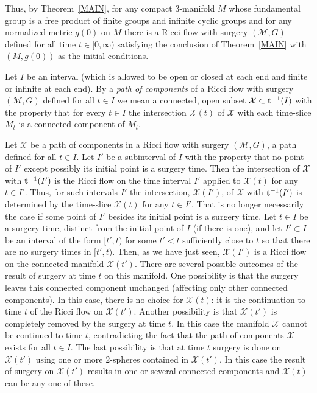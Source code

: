 Thus, by Theorem~\ref{MAIN},  for any compact $3$-manifold $M$ whose
fundamental group is a free product of finite groups and infinite cyclic groups
and for any normalized metric $g(0)$ on $M$ there is a Ricci flow with surgery
$({\mathcal M},G)$ defined for all time $t\in [0,\infty)$ satisfying the
conclusion of Theorem~\ref{MAIN} with $(M,g(0))$ as the initial conditions.

\begin{definition}
\label{def:path-of-components}
Let $I$ be an interval (which is allowed to be open or closed at
each end and finite or infinite at each end). By a {\em path of
components} of a Ricci flow with surgery $({\mathcal M},G)$ defined
for all $t\in I$ we mean a connected, open subset ${\mathcal
X}\subset {\bf t}^{-1}(I)$ with the property that for every $t\in I$
the intersection ${\mathcal X}(t)$ of ${\mathcal X}$ with each
time-slice $M_t$ is a connected component of $M_t$.
\end{definition}

Let ${\mathcal X}$ be a path of components in a Ricci flow with surgery
$({\mathcal M},G)$, a path defined for all $t\in I$. Let $I'$ be a subinterval
of $I$ with the property that no point of $I'$ except possibly its initial
point is a surgery time.  Then the intersection of ${\mathcal X}$ with ${\bf
t}^{-1}(I')$ is  the Ricci flow on the time interval $I'$ applied to ${\mathcal
X}(t)$ for any $t\in I'$.  Thus, for such intervals $I'$ the intersection,
${\mathcal X}(I')$, of ${\mathcal X}$ with ${\bf t}^{-1}(I')$ is determined by
the time-slice ${\mathcal X}(t)$ for any $t\in I'$. That is no longer
necessarily the case if some point of $I'$ besides its initial point is a
surgery time. Let $t\in I$ be a surgery time, distinct from the initial point
of $I$ (if there is one), and let $I'\subset I$ be an interval of the form
$[t',t)$ for some $t'<t$ sufficiently close to $t$ so that there are no surgery
times in $[t',t)$. Then, as we have just seen, ${\mathcal X}(I')$ is a Ricci
flow on the connected manifold ${\mathcal X}(t')$. There are several possible
outcomes of the result of surgery at time $t$ on this manifold. One possibility
is that the surgery leaves this connected component unchanged (affecting only
other connected components). In this case, there is no choice for ${\mathcal
X}(t)$: it is the continuation to time $t$ of the Ricci flow on ${\mathcal
X}(t')$. Another possibility is that ${\mathcal X}(t')$ is completely removed
by the surgery at time $t$. In this case the manifold ${\mathcal X}$ cannot be
continued to time $t$, contradicting the fact that the path of components
${\mathcal X}$ exists for all $t\in I$. The last possibility is that at time
$t$ surgery is done on ${\mathcal X}(t')$ using one or more $2$-spheres
contained in ${\mathcal X}(t')$. In this case the result of surgery on
${\mathcal X}(t')$ results in one or several connected components and
${\mathcal X}(t)$ can be any one of these.


